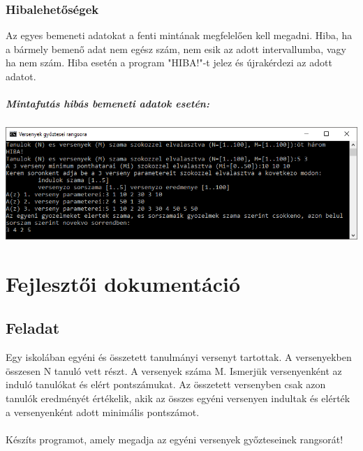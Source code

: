 \documentclass[a4paper]{article}
\begin{document}
      \subsubsection{Hibalehetőségek}
        Az egyes bemeneti adatokat a fenti mintának megfelelően kell megadni.
        Hiba, ha a bármely bemenő adat nem egész szám, nem esik az adott intervallumba,
        vagy ha nem szám.
        Hiba esetén a program "HIBA!"-t jelez és újrakérdezi az adott adatot.
        \subparagraph{Mintafutás hibás bemeneti adatok esetén:}
        \begin{center}
          \includegraphics[width=\textwidth]{felhHibas.PNG}
        \end{center}



  \newpage

  \section{Fejlesztői dokumentáció}
    \subsection{Feladat}
    Egy iskolában egyéni és összetett tanulmányi versenyt tartottak.
    A versenyekben összesen N tanuló vett részt. A versenyek száma M.
    Ismerjük versenyenként az induló tanulókat és elért pontszámukat.
    Az összetett versenyben csak azon tanulók eredményét értékelik,
    akik az összes egyéni versenyen indultak és elérték a versenyenként adott minimális pontszámot.
    \\
    \\ Készíts programot, amely megadja az egyéni versenyek győzteseinek rangsorát!
\end{document}
